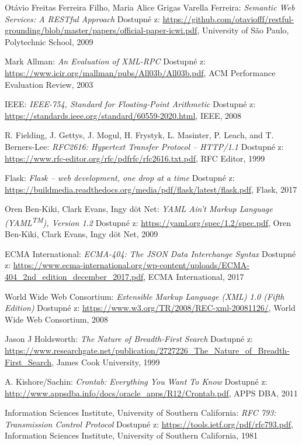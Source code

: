 \documentclass[czech, bachelor]{diploma}
\begin{document}
\begin{thebibliography}{50}
Otávio Freitas Ferreira Filho, Maria Alice Grigas Varella Ferreira: \textit{Semantic Web Services: A RESTful Approach}
Dostupné z:
\url{https://github.com/otaviofff/restful-grounding/blob/master/papers/official-paper-icwi.pdf},
University of São Paulo, Polytechnic School, 2009

Mark Allman: \textit{An Evaluation of XML-RPC}
Dostupné z:
\url{https://www.icir.org/mallman/pubs/All03b/All03b.pdf},
ACM Performance Evaluation Review, 2003

IEEE: \textit{IEEE-754, Standard for Floating-Point Arithmetic}
Dostupné z:
\url{https://standards.ieee.org/standard/60559-2020.html},
IEEE, 2008

R. Fielding, J. Gettys, J. Mogul, H. Frystyk, L. Masinter, P. Leach, and T. Berners-Lee: \textit{RFC2616: Hypertext Transfer
Protocol -- HTTP/1.1}
Dostupné z:
\url{https://www.rfc-editor.org/rfc/pdfrfc/rfc2616.txt.pdf},
RFC Editor, 1999

Flask: \textit{Flask -- web development, one drop at a time}
Dostupné z:
\url{https://buildmedia.readthedocs.org/media/pdf/flask/latest/flask.pdf},
Flask, 2017

Oren Ben-Kiki, Clark Evans, Ingy döt Net: \textit{YAML Ain't Markup Language (YAML\textsuperscript{TM}), Version 1.2}
Dostupné z:
\url{https://yaml.org/spec/1.2/spec.pdf},
Oren Ben-Kiki, Clark Evans, Ingy döt Net, 2009

ECMA International: \textit{ECMA-404: The JSON Data Interchange Syntax}
Dostupné z:
\url{https://www.ecma-international.org/wp-content/uploads/ECMA-404\_2nd\_edition\_december\_2017.pdf},
ECMA International, 2017

World Wide Web Consortium: \textit{Extensible Markup Language (XML) 1.0 (Fifth Edition)}
Dostupné z:
\url{https://www.w3.org/TR/2008/REC-xml-20081126/},
World Wide Web Consortium, 2008

Jason J Holdsworth: \textit{The Nature of Breadth-First Search}
Dostupné z:
\url{https://www.researchgate.net/publication/2727226\_The\_Nature\_of\_Breadth-First\_Search},
James Cook University, 1999

A. Kishore/Sachin: \textit{Crontab: Everything You Want To Know}
Dostupné z:
\url{http://www.appsdba.info/docs/oracle\_apps/R12/Crontab.pdf},
APPS DBA, 2011

Information Sciences Institute, University of Southern California: \textit{RFC 793: Transmission Control Protocol}
Dostupné z:
\url{https://tools.ietf.org/pdf/rfc793.pdf},
Information Sciences Institute, University of Southern California, 1981


\end{thebibliography}
\end{document}
